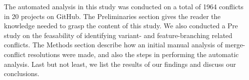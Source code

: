 The automated analysis in this study was conducted on a total of 1964 conflicts in 20 projects on GitHub. The Preliminaries section gives the reader the knowledge needed to grasp the content of this study. We also conducted a Pre study on the feasability of identifying variant- and feature-branching related conflicts. The Methods section describe how an initial manual analysis of merge-conflict resolutions were made, and also the steps in performing the automatic analysis. Last but not least, we list the results of our findings and discuss our conclusions.
